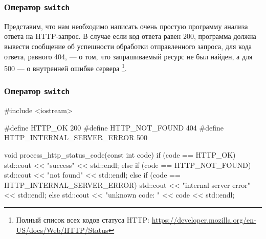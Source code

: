 \documentclass[compress, 8pt, aspectratio=169]{beamer}
\begin{document}
\begin{frame}[fragile]

    \frametitle{Оператор \texttt{switch}}

    Представим, что нам необходимо написать очень простую программу анализа
    ответа на HTTP-запрос.
    В случае если код ответа равен 200, программа должна вывести сообщение
    об успешности обработки отправленного запроса, для кода ответа, равного
    404, — о том, что запрашиваемый ресурс не был найден, а для 500 — о
    внутренней ошибке сервера
    \footnote{Полный список всех кодов статуса HTTP:
        \url{https://developer.mozilla.org/en-US/docs/Web/HTTP/Status}}.

\end{frame}

\begin{frame}[fragile]

    \frametitle{Оператор \texttt{switch}}

    \begin{myinplacelisting}[minted language=cpp]
#include <iostream>

#define HTTP_OK 200
#define HTTP_NOT_FOUND 404
#define HTTP_INTERNAL_SERVER_ERROR 500

void process_http_status_code(const int code) {
    if (code == HTTP_OK) {
        std::cout << "success" << std::endl;
    }
    else if (code == HTTP_NOT_FOUND) {
        std::cout << "not found" << std::endl;
    }
    else if (code == HTTP_INTERNAL_SERVER_ERROR) {
        std::cout << "internal server error" << std::endl;
    }
    else {
        std::cout << "unknown code: " << code << std::endl;
    }
}
    \end{myinplacelisting}

\end{frame}
\end{document}
